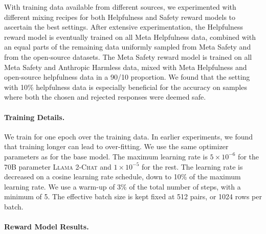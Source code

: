 \documentclass{article}
\newcommand{\modelname}{\textsc{Llama 2-Chat}\xspace}
\begin{document}
With training data available from different sources, we experimented with different mixing recipes for both Helpfulness and Safety reward models to ascertain the best settings. 
After extensive experimentation, the Helpfulness reward model is eventually trained on all Meta Helpfulness data, combined with an equal parts of the remaining data uniformly sampled from Meta Safety and from the open-source datasets. 
The Meta Safety reward model is trained on all Meta Safety and Anthropic Harmless data, mixed with Meta Helpfulness and open-source helpfulness data in a 90/10 proportion.
We found that the setting with 10\% helpfulness data is especially beneficial for the accuracy on samples where both the chosen and rejected responses were deemed safe.

\paragraph{Training Details.} 
We train for one epoch over the training data. In earlier experiments, we found that training longer can lead to over-fitting. We use the same optimizer parameters as for the base model. The maximum learning rate is $5\times10^{-6}$ for the 70B parameter \modelname and $1\times10^{-5}$ for the rest. 
The learning rate is decreased on a cosine learning rate schedule, down to 10\% of the maximum learning rate. 
We use a warm-up of 3\% of the total number of steps, with a minimum of 5. The effective batch size is kept fixed at 512 pairs, or 1024 rows per batch. 


\paragraph{Reward Model Results.}
\label{sec:reward_model_results}
\end{document}
